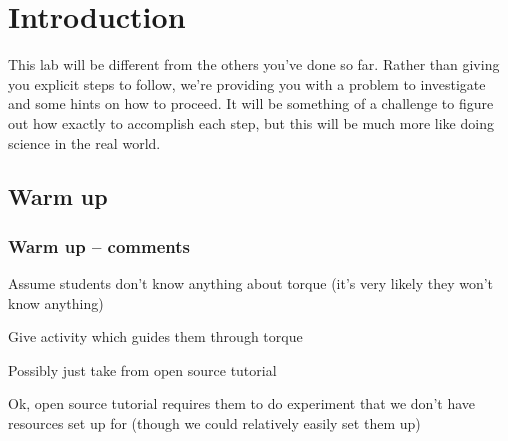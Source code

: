 \documentclass[11pt,letterpaper]{article}
\newcommand{\TODO}[2][inline,color=green!40]{{ \todo[#1]{#2} }}
\begin{document}
\begin{comment}
\subsubsection*{Get your head in the game}

Before making use of the apparatus,
let's do a brief warm up problem concerning \emph{torque}.

\TODO{TODO -- Now include an unrelated warm up problem dealing with
	static torque.  Possibly take this from UMD open source tutorials,
	or from tutorial books.}

\TODO{Maybe include a section getting students acquainted with the
	torque equation we're attempting to verify (relating bicep force to the
	force on the hand).}

\subsection*{Investigation}

Rather than telling you exactly what to do, 
in this lab we're going to allow you much more freedom to
investigate the physics behind this situation on your own.

}}}
\end{comment}


\section*{Introduction}

This lab will be different from the others you've done so far.
Rather than giving you explicit steps to follow,
we're providing you with a problem to investigate
and some hints on how to proceed.  
It will be something of a challenge to figure out how exactly to accomplish
each step, but this will be much more like doing science in the real world.


\subsection*{Warm up}
\subsubsection*{Warm up -- comments }
\itemb
	\item Assume students don't know anything about torque
		(it's very likely they won't know anything)
	\item Give activity which guides them through torque
	\item Possibly just take from open source tutorial
	\item Ok, open source tutorial requires them to do experiment that we don't
		have resources set up for (though we could relatively easily set them up)
\iteme
\end{document}
